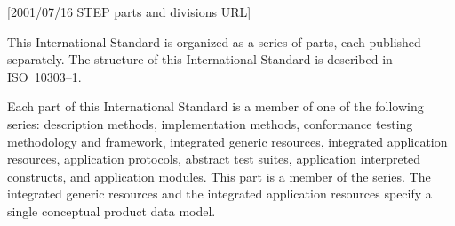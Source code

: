 [2001/07/16 STEP parts and divisions URL]

    This International Standard is organized as a series of parts,
each published separately. The structure of this International
Standard is described in ISO~10303--1.

    Each part of this International Standard is a member of one
of the following series:
description methods,
implementation methods,
conformance testing methodology and framework,
integrated generic resources,
integrated application resources,
application protocols,
abstract test suites,
application interpreted constructs,
and
application modules.
This part is a member of the \theseries{} series.
\ifanir The integrated generic resources and the integrated application
        resources specify a single conceptual product data model.
\fi

\endinput
